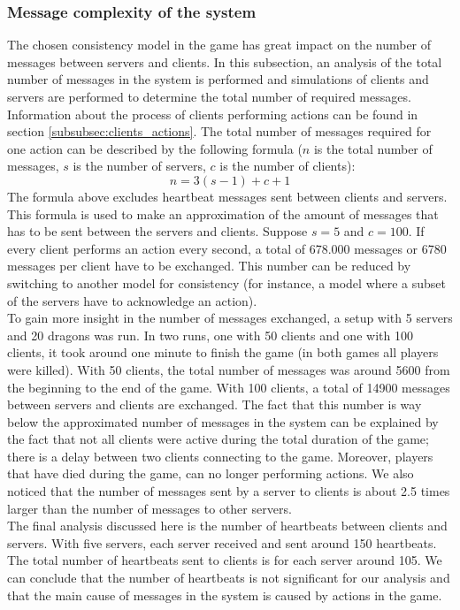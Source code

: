 	\subsubsection{Message complexity of the system}
	\label{subsubsec:nummessages}
		The chosen consistency model in the game has great impact on the number of messages between servers and clients. 
		In this subsection, an analysis of the total number of messages in the system is performed and simulations of clients and servers are performed to determine the total number of required messages.\\
		
		Information about the process of clients performing actions can be found in section \ref{subsubsec:clients_actions}. 
		The total number of messages required for one action can be described by the following formula ($ n $ is the total number of messages, $ s $ is the number of servers, $ c $ is the number of clients):
		$$ n = 3(s - 1) + c + 1 $$
		The formula above excludes heartbeat messages sent between clients and servers.
		This formula is used to make an approximation of the amount of messages that has to be sent between the servers and clients. 
		Suppose $ s = 5 $ and $ c = 100 $. 
		If every client performs an action every second, a total of 678.000 messages or 6780 messages per client have to be exchanged. 
		This number can be reduced by switching to another model for consistency (for instance, a model where a subset of the servers have to acknowledge an action).\\
		To gain more insight in the number of messages exchanged, a setup with 5 servers and 20 dragons was run. 
		In two runs, one with 50 clients and one with 100 clients, it took around one minute to finish the game (in both games all players were killed). 
		With 50 clients, the total number of messages was around 5600 from the beginning to the end of the game. 
		With 100 clients, a total of 14900 messages between servers and clients are exchanged. 
		The fact that this number is way below the approximated number of messages in the system can be explained by the fact that not all clients were active during the total duration of the game; there is a delay between two clients connecting to the game. 
		Moreover, players that have died during the game, can no longer performing actions. We also noticed that the number of messages sent by a server to clients is about 2.5 times larger than the number of messages to other servers.\\
		The final analysis discussed here is the number of heartbeats between clients and servers. 
		With five servers, each server received and sent around 150 heartbeats. 
		The total number of heartbeats sent to clients is for each server around 105. 
		We can conclude that the number of heartbeats is not significant for our analysis and that the main cause of messages in the system is caused by actions in the game.

